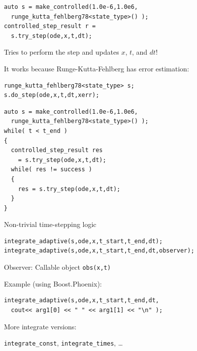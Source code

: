 \begin{frame}[fragile]
 
 
 \vspace{2ex}

 \begin{lstlisting}
auto s = make_controlled(1.0e-6,1.0e6,
  runge_kutta_fehlberg78<state_type>() );
controlled_step_result r = 
  s.try_step(ode,x,t,dt);
 \end{lstlisting}

 Tries to perform the step and updates $x$, $t$, and $dt$!

 \vspace{4ex}

 It works because Runge-Kutta-Fehlberg has error estimation:

 \begin{lstlisting}
runge_kutta_fehlberg78<state_type> s;
s.do_step(ode,x,t,dt,xerr);
 \end{lstlisting}


\end{frame}


\begin{frame}[fragile]


\vspace{2ex}

\begin{lstlisting}
auto s = make_controlled(1.0e-6,1.0e6,
  runge_kutta_fehlberg78<state_type>() );
while( t < t_end )
{
  controlled_step_result res
    = s.try_step(ode,x,t,dt);
  while( res != success )
  {
    res = s.try_step(ode,x,t,dt);
  }
}
\end{lstlisting}

\centerline{Non-trivial time-stepping logic}

\end{frame}


\begin{frame}[fragile]


\vspace{2ex}


\begin{lstlisting}
integrate_adaptive(s,ode,x,t_start,t_end,dt); 
integrate_adaptive(s,ode,x,t_start,t_end,dt,observer);
\end{lstlisting}

Observer: Callable object {\tt obs(x,t)}

\vspace{4ex}
Example (using Boost.Phoenix):
\begin{lstlisting}
integrate_adaptive(s,ode,x,t_start,t_end,dt,
  cout<< arg1[0] << " " << arg1[1] << "\n" );
\end{lstlisting}

\vspace{2ex}
More integrate versions:

{\tt integrate\_const}, {\tt integrate\_times}, \dots

\end{frame}



